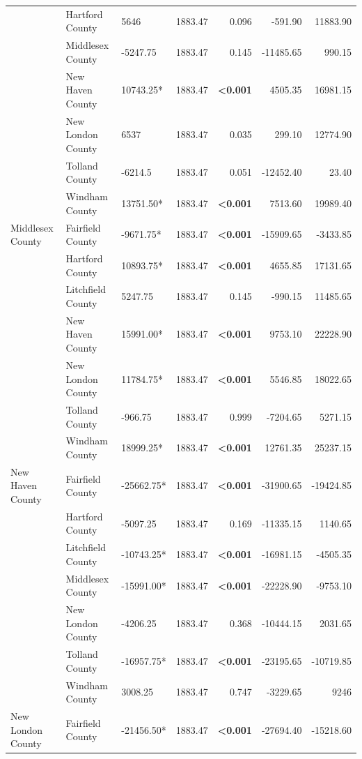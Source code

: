 \documentclass[12pt]{article}
\begin{document}
\begin{table}[htbp]
{\begin{tabular}{lllrrrr}
    & Hartford County & 5646 & 1883.47 & 0.096 & -591.90 & 11883.90 \\
    & Middlesex County & -5247.75 & 1883.47 & 0.145 & -11485.65 & 990.15 \\
    & New Haven County & 10743.25* & 1883.47 & \textbf{\textless0.001} & 4505.35 & 16981.15 \\
    & New London County & 6537 & 1883.47 & 0.035 & 299.10 & 12774.90 \\
    & Tolland County & -6214.5 & 1883.47 & 0.051 & -12452.40 & 23.40 \\
    & Windham County & 13751.50* & 1883.47 & \textbf{\textless0.001} & 7513.60 & 19989.40 \\
    \midrule
    Middlesex County & Fairfield County & -9671.75* & 1883.47 & \textbf{\textless0.001} & -15909.65 & -3433.85 \\
    & Hartford County & 10893.75* & 1883.47 & \textbf{\textless0.001} & 4655.85 & 17131.65 \\
    & Litchfield County & 5247.75 & 1883.47 & 0.145 & -990.15 & 11485.65 \\
    & New Haven County & 15991.00* & 1883.47 & \textbf{\textless0.001} & 9753.10 & 22228.90 \\
    & New London County & 11784.75* & 1883.47 & \textbf{\textless0.001} & 5546.85 & 18022.65 \\
    & Tolland County & -966.75 & 1883.47 & 0.999 & -7204.65 & 5271.15 \\
    & Windham County & 18999.25* & 1883.47 & \textbf{\textless0.001} & 12761.35 & 25237.15 \\
    \midrule
    New Haven County & Fairfield County & -25662.75* & 1883.47 & \textbf{\textless0.001} & -31900.65 & -19424.85 \\
    & Hartford County & -5097.25 & 1883.47 & 0.169 & -11335.15 & 1140.65 \\
    & Litchfield County & -10743.25* & 1883.47 & \textbf{\textless0.001} & -16981.15 & -4505.35 \\
    & Middlesex County & -15991.00* & 1883.47 & \textbf{\textless0.001} & -22228.90 & -9753.10 \\
    & New London County & -4206.25 & 1883.47 & 0.368 & -10444.15 & 2031.65 \\
    & Tolland County & -16957.75* & 1883.47 & \textbf{\textless0.001} & -23195.65 & -10719.85 \\
    & Windham County & 3008.25 & 1883.47 & 0.747 & -3229.65 & 9246 \\
    \midrule
    New London County & Fairfield County & -21456.50* & 1883.47 & \textbf{\textless0.001} & -27694.40 & -15218.60 \\

\end{tabular}}
\end{table}
\end{document}
